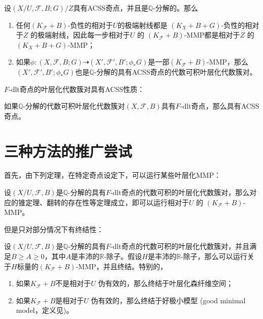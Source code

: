 \begin{proposition}\cite[Lemma 4.8]{acc_foliation}\label{acssmmp }
 设$(X/U,\mathcal{F},B;G)/Z$具有ACSS奇点，并且是$\mathbb{Q}$-分解的。那么 
 \begin{enumerate}
   \item 任何$(K_{\mathcal{F}}+B)$-负性的相对于$U$的极端射线都是 $(K_{X}+B+G)$-负性的相对于$Z$ 的极端射线，因此每一步相对于$U$ 的 $(K_{\mathcal{F}}+B)$-MMP都是相对于$Z$ 的$(K_{X}+B+G)$-MMP；
   \item 如果$\phi:(X,\mathcal{F},B;G) \dashrightarrow (X',\mathcal{F}',B';\phi_{*}G)$是一部$(K_{\mathcal{F}}+B)$-MMP，那么$(X',\mathcal{F}',B';\phi_{*}G)$也是$\mathbb{Q}$-分解的具有ACSS奇点的代数可积叶层化代数簇对。
 \end{enumerate}
\end{proposition}
$F$-dlt奇点的叶层化代数簇对具有ACSS性质：
\begin{theorem}\cite[Theorem 17.0.1]{chlx}
 如果$\mathbb{Q}$-分解的代数可积叶层化代数簇对$(X,\mathcal{F},B)$具有$F$-dlt奇点，那么具有ACSS奇点。  
\end{theorem}

\section{三种方法的推广尝试}
首先，由下列定理，在特定奇点设定下，可以运行某些叶层化MMP：
\begin{theorem}[叶层化MMP]\cite[Theorem 2.1.1]{chlx}
设$(X/U,\mathcal{F},B)$是$\mathbb{Q}$-分解的具有$F$-dlt奇点的代数可积的叶层化代数簇对，那么对应的锥定理、翻转的存在性等定理成立，即可以运行相对于$U$ 的 $(K_{\mathcal{F}}+B)$-MMP。  
\end{theorem}
但是只对部分情况下有终结性：
\begin{theorem}[叶层化MMP终结性]\cite[Theorem 2.1.2]{chlx}
设$(X/U,\mathcal{F},B)$是$\mathbb{Q}$-分解的具有$F$-dlt奇点的代数可积的叶层化代数簇对，并且满足$B\geqslant A \geqslant 0$，其中$A$是丰沛的$\mathbb{R}$-除子。假设$H$是丰沛的$\mathbb{R}$-除子，那么可以运行关于$H$标量的$(K_{\mathcal{F}}+B)$-MMP，并且终结。特别的，
\begin{enumerate}
  \item 如果$K_{\mathcal{F}}+B$不是相对于$U$ 伪有效的，那么终结于叶层化森纤维空间；
  \item 如果$K_{\mathcal{F}}+B$是相对于$U$ 伪有效的，那么终结于好极小模型 (good minimal model，定义见\cite[Definition 9.1.1]{chlx})。
\end{enumerate}
\end{theorem}

